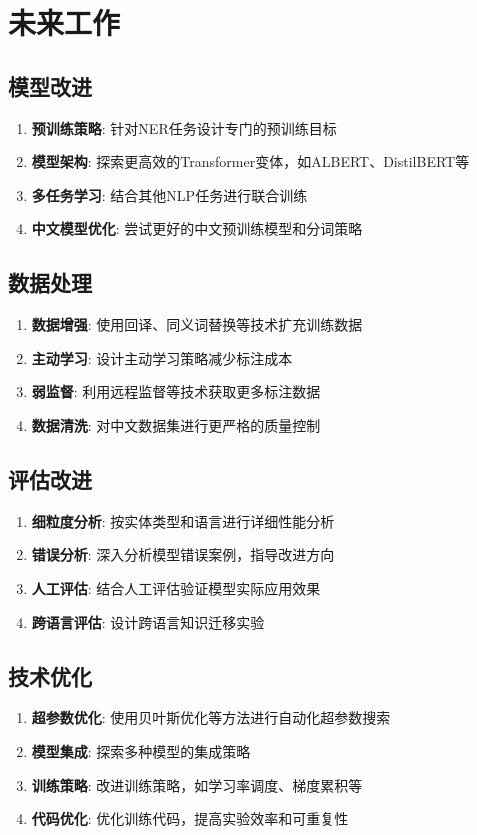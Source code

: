 \documentclass{article}
\begin{document}
\section{未来工作}

\subsection{模型改进}
\begin{enumerate}
    \item \textbf{预训练策略}: 针对NER任务设计专门的预训练目标
    \item \textbf{模型架构}: 探索更高效的Transformer变体，如ALBERT、DistilBERT等
    \item \textbf{多任务学习}: 结合其他NLP任务进行联合训练
    \item \textbf{中文模型优化}: 尝试更好的中文预训练模型和分词策略
\end{enumerate}

\subsection{数据处理}
\begin{enumerate}
    \item \textbf{数据增强}: 使用回译、同义词替换等技术扩充训练数据
    \item \textbf{主动学习}: 设计主动学习策略减少标注成本
    \item \textbf{弱监督}: 利用远程监督等技术获取更多标注数据
    \item \textbf{数据清洗}: 对中文数据集进行更严格的质量控制
\end{enumerate}

\subsection{评估改进}
\begin{enumerate}
    \item \textbf{细粒度分析}: 按实体类型和语言进行详细性能分析
    \item \textbf{错误分析}: 深入分析模型错误案例，指导改进方向
    \item \textbf{人工评估}: 结合人工评估验证模型实际应用效果
    \item \textbf{跨语言评估}: 设计跨语言知识迁移实验
\end{enumerate}

\subsection{技术优化}
\begin{enumerate}
    \item \textbf{超参数优化}: 使用贝叶斯优化等方法进行自动化超参数搜索
    \item \textbf{模型集成}: 探索多种模型的集成策略
    \item \textbf{训练策略}: 改进训练策略，如学习率调度、梯度累积等
    \item \textbf{代码优化}: 优化训练代码，提高实验效率和可重复性
\end{enumerate}
\end{document}
